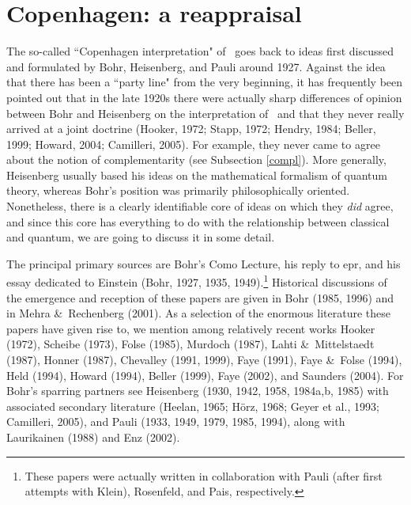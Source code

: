 \documentclass[12pt,titlepage]{article}
\newcommand{\epr}{{\sc epr}}
\begin{document}
 \section{Copenhagen: a reappraisal}\label{S3}\setcounter{equation}{0}
The  so-called ``Copenhagen interpretation" of \qm\ goes back to ideas first discussed and formulated by Bohr, Heisenberg, and Pauli around 1927. 
Against the idea that there has been a ``party line" from the very beginning, 
it has frequently been pointed out that in the late 1920s there were actually sharp differences of opinion between Bohr and Heisenberg on the interpretation of \qm\ and that they never really arrived at a joint doctrine  (Hooker, 1972; Stapp, 1972;  Hendry, 1984;   Beller, 1999;   Howard, 2004; Camilleri, 2005). For example, they never came to agree about the notion of complementarity (see Subsection \ref{compl}). More generally,  Heisenberg usually based  his ideas on the mathematical formalism of quantum theory, whereas Bohr's position was primarily philosophically oriented. Nonetheless, there is a clearly identifiable core of ideas on which they {\it did} agree, and since this core has everything to do with the relationship between classical and quantum, we are going to discuss it in some detail. 

The principal  primary sources are Bohr's Como Lecture, his reply to \epr, and his essay dedicated to Einstein (Bohr, 1927,  1935, 1949).\footnote{ 
These papers were actually written in collaboration with Pauli (after first attempts with Klein), Rosenfeld, and Pais, respectively.}  Historical discussions of the emergence and reception of these papers are given in Bohr (1985, 1996) and in Mehra \&\ Rechenberg (2001).  As a selection of the enormous literature these papers have given rise to, we mention 
among relatively recent works Hooker (1972), Scheibe (1973), Folse (1985), Murdoch (1987), Lahti \&\ Mittelstaedt (1987), Honner (1987), Chevalley (1991, 1999), Faye (1991), Faye \&\ Folse (1994), Held (1994),  Howard (1994),  Beller (1999), Faye (2002), and Saunders (2004).
For Bohr's sparring partners  see Heisenberg (1930, 1942, 1958, 1984a,b, 1985) with associated secondary literature (Heelan, 1965; H\"{o}rz, 1968; Geyer  
et al., 1993; Camilleri, 2005),  and Pauli (1933, 1949, 1979, 1985, 1994), along with Laurikainen (1988) and Enz (2002). 
  
\end{document}
